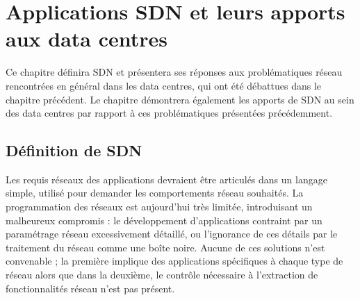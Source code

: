 
\chapter{Applications SDN et leurs apports aux data centres}

Ce chapitre définira SDN et présentera ses réponses aux problématiques réseau rencontrées en général dans les data centres, qui ont été débattues dans le chapitre précédent. %
Le chapitre démontrera également les apports de SDN au sein des data centres par rapport à ces problématiques présentées précédemment.

\section{Définition de SDN}

Les requis réseaux des applications devraient être articulés dans un langage simple, utilisé pour demander les comportements réseau souhaités. La  programmation des réseaux est aujourd'hui très limitée, introduisant un malheureux compromis : le développement d'applications contraint par un paramétrage réseau excessivement détaillé, ou l'ignorance de ces détails par le traitement du réseau comme une boîte noire. Aucune de ces solutions n'est convenable ; la première implique des applications spécifiques à chaque type de réseau alors que dans la deuxième, le contrôle nécessaire à l'extraction de fonctionnalités réseau n'est pas présent. 


